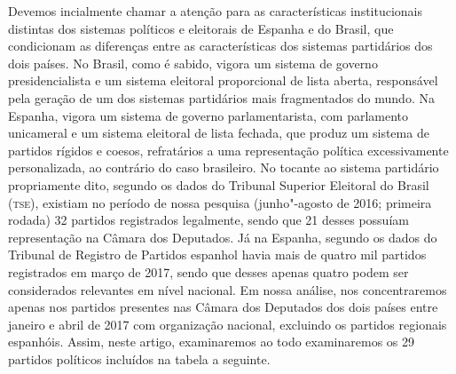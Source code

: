 Devemos incialmente chamar a atenção para as características
institucionais distintas dos sistemas políticos e eleitorais de Espanha
e do Brasil, que condicionam as diferenças entre as características dos
sistemas partidários dos dois países. No Brasil, como é sabido, vigora
um sistema de governo presidencialista e um sistema eleitoral
proporcional de lista aberta, responsável pela geração de um dos
sistemas partidários mais fragmentados do mundo. Na Espanha, vigora um
sistema de governo parlamentarista, com parlamento unicameral e um
sistema eleitoral de lista fechada, que produz um sistema de partidos
rígidos e coesos, refratários a uma representação política
excessivamente personalizada, ao contrário do caso brasileiro. No
tocante ao sistema partidário propriamente dito, segundo os dados do
Tribunal Superior Eleitoral do Brasil (\textsc{tse}), existiam no período de
nossa pesquisa (junho"-agosto de 2016; primeira rodada) 32 partidos
registrados legalmente, sendo que 21 desses possuíam representação na
Câmara dos Deputados. Já na Espanha, segundo os dados do Tribunal de
Registro de Partidos espanhol havia mais de quatro mil partidos
registrados em março de 2017, sendo que desses apenas quatro podem ser
considerados relevantes em nível nacional. Em nossa análise, nos
concentraremos apenas nos partidos presentes nas Câmara dos Deputados
dos dois países entre janeiro e abril de 2017 com organização nacional,
excluindo os partidos regionais espanhóis. Assim, neste artigo,
examinaremos ao todo examinaremos os 29 partidos políticos incluídos na
tabela a seguinte.



